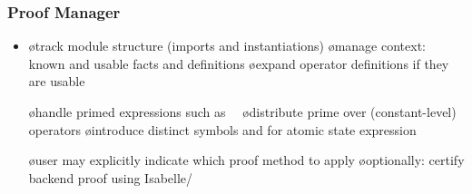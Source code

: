 \documentclass[fleqn]{beamer}
\begin{document}
\begin{frame}
  \frametitle{Proof Manager}

  \begin{itemize}
  \item {}

    \begin{itemize}
    \o track module structure (imports and instantiations)
    \o manage context: known and usable facts and definitions
    \o expand operator definitions if they are usable
    \end{itemize}

  \oo {}

    \begin{itemize}
    \o handle primed expressions such as\ \ 
    \o distribute prime over (constant-level) operators
    \o introduce distinct symbols  and 
       for atomic state expression 
    \end{itemize}

  \oo {}

    \begin{itemize}
    \o user may explicitly indicate which proof method to apply
    \o optionally: certify backend proof using Isabelle/\tlaplus
    \end{itemize}
  \end{itemize}
\end{frame}
\end{document}
